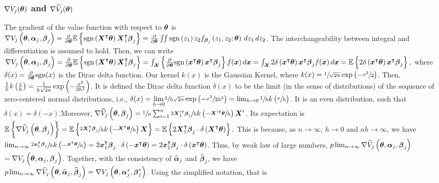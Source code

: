\subsubsection{$\nabla V_j(\boldsymbol{\theta})$ and $\nabla\widehat{V}_j(\boldsymbol{\theta})$}
The gradient of the value function with respect to $\boldsymbol{\theta}$ is \\
$\nabla V_j\left(\boldsymbol{\theta}, \boldsymbol{\alpha}_j, \boldsymbol{\beta}_j\right) = \frac{\partial}{\partial \boldsymbol{\theta}} \mathbb{E}\left\{ \text{sgn}\left(\boldsymbol{X}^{\intercal}\boldsymbol{\theta}\right)\boldsymbol{X}_1^{\intercal}\boldsymbol{\beta}_j \right\} =\frac{\partial}{\partial \boldsymbol{\theta}} \iint \text{sgn}\left(z_1\right)z_2 f_{\boldsymbol{\beta}_j}\left(z_1, z_2; \boldsymbol{\theta}\right) \,dz_1 \,dz_2$.
The interchangeability between integral and differentiation is assumed to hold. Then, we can write $\nabla V_j\left(\boldsymbol{\theta}, \boldsymbol{\alpha}_j, \boldsymbol{\beta}_j\right)
 =\frac{\partial}{\partial \boldsymbol{\theta}} \mathbb{E}\left\{ \text{sgn}\left(\boldsymbol{X}^{\intercal}\boldsymbol{\theta}\right)\boldsymbol{X}_1^{\intercal}\boldsymbol{\beta}_j \right\} 
=  \int_{\boldsymbol{\mathcal{X}}}\left\{\frac{\partial}{\partial \boldsymbol{\theta}} \text{sgn}\left( \boldsymbol{x}^{\intercal}\boldsymbol{\theta}\right)\boldsymbol{x}^{\intercal}\boldsymbol{\beta}_j\right\}f(\boldsymbol{x})\,d\boldsymbol{x}
= \int_{\boldsymbol{\mathcal{X}}} 2\delta\left( \boldsymbol{x}^{\intercal}\boldsymbol{\theta} \right)\boldsymbol{x}^{\intercal}\boldsymbol{\beta}_j f(\boldsymbol{x})\,d\boldsymbol{x}
= \mathbb{E}\left\{ 2\delta\left( \boldsymbol{x}^{\intercal}\boldsymbol{\theta} \right)\boldsymbol{x}^{\intercal}\boldsymbol{\beta}_j\right\},$ 
where $\delta(x) = \frac{\partial}{\partial \boldsymbol{\theta}}\text{sgn}(x)$ is the Dirac delta function.
Our kernel $k(x)$ is the Gaussian Kernel, where $k(x) = \sfrac{1}{\sqrt{2\pi}} \exp\left( - \sfrac{x^2}{2}\right)$. Then, $\frac{1}{h}k\left(\frac{x}{h}\right) = \frac{1}{h\sqrt{2\pi}} \exp\left( - \frac{x^2}{2h^2}\right)$. It is defined the Dirac delta function $\delta(x)$ to be the limit (in the sense of distributions) of the sequence of zero-centered normal distributions, i.e., $\delta(x) = \underset{h \to 0}{\lim}\sfrac{1}{h\sqrt{2\pi}} \exp\left(-\sfrac{x^2}{2h^2}\right) = \lim_{h \to 0}\sfrac{1}{h}k\left(\sfrac{x}{h}\right)$. It is an even distribution, such that $\delta(x) = \delta(-x)$.Moreover, $\nabla\widehat{V}_j\left(\boldsymbol{\theta}, \boldsymbol{\beta}_j\right)=  \sfrac{1}{n}\sum_{i=1}^{n}\sfrac{2\boldsymbol{X}_{1}^{i\intercal}\boldsymbol{\beta}_{j}}{h}k\left(-\sfrac{\boldsymbol{X}^{i\intercal}\boldsymbol{\theta}}{h}\right)\boldsymbol{X}^{i}$. Its expectation is $\mathbb{E}\left\{ \nabla\widehat{V}_j\left(\boldsymbol{\theta}, \boldsymbol{\beta}_j\right) \right\}=  \mathbb{E}\left\{ \sfrac{2\boldsymbol{X}_{1}^{\intercal}\boldsymbol{\beta}_{j}}{h}k\left(-\sfrac{\boldsymbol{X}^{\intercal}\boldsymbol{\theta}}{h}\right)\boldsymbol{X}\right\} = \mathbb{E}\left\{2\boldsymbol{X}_{1}^{\intercal}\boldsymbol{\beta}_{j}\cdot\delta\left(\boldsymbol{X}^{\intercal}\boldsymbol{\theta}\right)\right\}.$ This is because, as $n\to \infty$, $h \to 0$  and $nh \to \infty$, we have $\lim_{n \to \infty} \sfrac{2\boldsymbol{x}_1^{\intercal}\boldsymbol{\beta}_{j}}{h}k\left(-\sfrac{\boldsymbol{x}^{\intercal}\boldsymbol{\theta}}{h}\right) = 2\boldsymbol{x}_{1}^{\intercal}\boldsymbol{\beta}_{j}\cdot\delta\left(-\boldsymbol{x}^{\intercal}\boldsymbol{\theta}\right)= 2\boldsymbol{x}_{1}^{\intercal}\boldsymbol{\beta}_{j}\cdot\delta\left(\boldsymbol{x}^{\intercal}\boldsymbol{\theta}\right)$. Thus, by weak law of large numbers, $p\lim_{n\to\infty}\nabla\widehat{V}_j\left(\boldsymbol{\theta}, \boldsymbol{\alpha}_j, \boldsymbol{\beta}_j\right)$ \\$=\nabla V_j\left(\boldsymbol{\theta}, \boldsymbol{\alpha}_j, \boldsymbol{\beta}_j\right)$. Together, with the consistency of $\widehat{\boldsymbol{\alpha}}_j$ and $\widehat{\boldsymbol{\beta}}_j$, we have \\$p\lim_{n\to\infty}\nabla\widehat{V}_j\left(\boldsymbol{\theta},\widehat{\boldsymbol{\alpha}}_j, \widehat{\boldsymbol{\beta}}_j\right)=  \nabla V_j\left(\boldsymbol{\theta}, \boldsymbol{\alpha}^*_j, \boldsymbol{\beta}^*_j\right)$. Using the simplified notation, that is 
